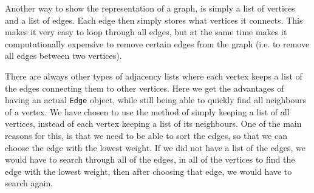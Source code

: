 Another way to show the representation of a graph, is simply a list of vertices and a list of edges. 
Each edge then simply stores what vertices it connects. 
This makes it very easy to loop through all edges, but at the same time makes it computationally expensive to remove certain edges from the graph (i.e. 
to remove all edges between two vertices).

There are always other types of adjacency lists where each vertex keeps a list of the edges connecting them to other vertices. Here we get the advantages of having an actual \lstinline|Edge| object, while still being able to quickly find all neighbours of a vertex.
We have chosen to use the method of simply keeping a list of all vertices, instead of each vertex keeping a list of its neighbours. One of the main reasons for this, is that we need to be able to sort the edges, so that we can choose the edge with the lowest weight. If we did not have a list of the edges, we would have to search through all of the edges, in all of the vertices to find the edge with the lowest weight, then after choosing that edge, we would have to search again.
